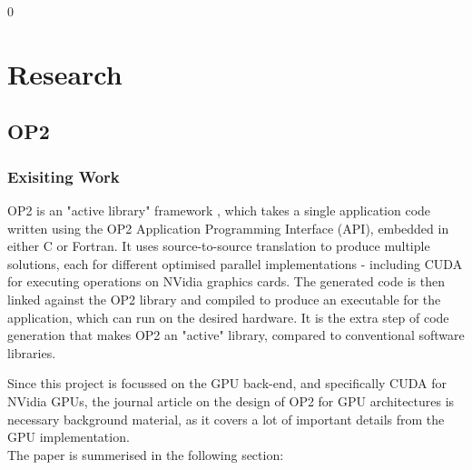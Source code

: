 0%

\section{Research}
\label{s:research}

\subsection{OP2}

\subsubsection{Exisiting Work}

OP2 is an "active library" framework \cite{op2main}, which takes a single application code written using the OP2 Application Programming Interface (API), embedded in either C or Fortran. It uses source-to-source translation to produce multiple solutions, each for different optimised parallel implementations - including CUDA for executing operations on NVidia graphics cards. The generated code is then linked against the OP2 library and compiled to produce an executable for the application, which can run on the desired hardware. It is the extra step of code generation that makes OP2 an "active" library, compared to conventional software libraries.
\par
Since this project is focussed on the GPU back-end, and specifically CUDA for NVidia GPUs, the journal article on the design of OP2 for GPU architectures \cite{gpudesign} is necessary background material, as it covers a lot of important details from the GPU implementation.\\ The paper is summerised in the following section:

